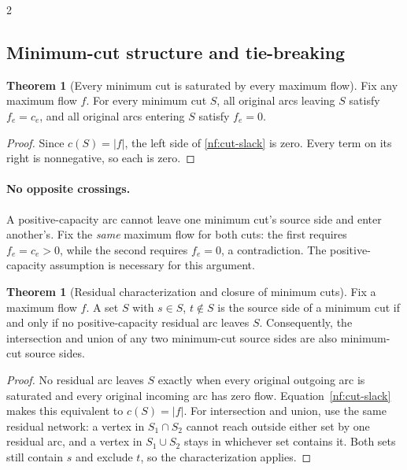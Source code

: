 \documentclass[10pt]{article}
\theoremstyle{definition}
\newtheorem{theorem}[definition]{Theorem}
\begin{document}
\begin{multicols*}{2}
\subsection{Minimum-cut structure and tie-breaking}\label{nf:cut-structure}
\begin{theorem}[Every minimum cut is saturated by every maximum flow]
Fix any maximum flow $f$. For every minimum cut $S$, all original arcs
leaving $S$ satisfy $f_e=c_e$, and all original arcs entering $S$ satisfy
$f_e=0$.
\end{theorem}
\begin{proof}
Since $c(S)=|f|$, the left side of \eqref{nf:cut-slack} is zero.
Every term on its right is nonnegative, so each is zero.
\end{proof}
\paragraph{No opposite crossings.}
A positive-capacity arc cannot leave one minimum cut's source side and enter
another's. Fix the \emph{same} maximum flow for both cuts: the first requires
$f_e=c_e>0$, while the second requires $f_e=0$, a contradiction.
The positive-capacity assumption is necessary for this argument.

\begin{theorem}[Residual characterization and closure of minimum cuts]\label{nf:cut-lattice}
Fix a maximum flow $f$. A set $S$ with $s\in S$, $t\notin S$ is the
source side of a minimum cut if and only if no positive-capacity residual
arc leaves $S$. Consequently, the intersection and union of any two
minimum-cut source sides are also minimum-cut source sides.
\end{theorem}
\begin{proof}
No residual arc leaves $S$ exactly when every original outgoing arc is
saturated and every original incoming arc has zero flow.
Equation~\eqref{nf:cut-slack} makes this equivalent to $c(S)=|f|$.
For intersection and union, use the same residual network: a vertex in
$S_1\cap S_2$ cannot reach outside either set by one residual arc, and a
vertex in $S_1\cup S_2$ stays in whichever set contains it. Both sets
still contain $s$ and exclude $t$, so the characterization applies.
\end{proof}


\end{multicols*}
\end{document}
